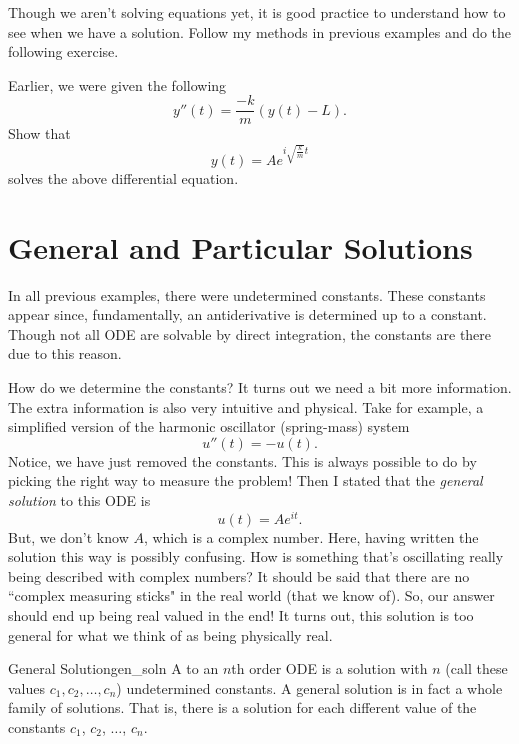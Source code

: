         
        \noindent Though we aren't solving equations yet, it is good practice to understand how to see when we have a solution.  Follow my methods in previous examples and do the following exercise.
        
        \begin{exercise} Earlier, we were given the following
        \[
        y''(t) = \frac{-k}{m} (y(t)-L).
        \]
        Show that
        \[
        y(t) = Ae^{i\sqrt{\frac{k}{m}}t}
        \]
        solves the above differential equation.
        \end{exercise}
        
        \section{General and Particular Solutions}
        In all previous examples, there were undetermined constants.  These constants appear since, fundamentally, an antiderivative is determined up to a constant.  Though not all ODE are solvable by direct integration, the constants are there due to this reason.
        
        How do we determine the constants?  It turns out we need a bit more information.  The extra information is also very intuitive and physical.  Take for example, a simplified version of the harmonic oscillator (spring-mass) system
        \[
        u''(t) = -u(t).
        \]
        Notice, we have just removed the constants.  This is always possible to do by picking the right way to measure the problem! Then I stated that the \emph{general solution}  to this ODE is
        \[
        u(t)=Ae^{it}.
        \]
        But, we don't know $A$, which is a complex number. Here, having written the solution this way is possibly confusing.  How is something that's oscillating really being described with complex numbers? It should be said that there are no ``complex measuring sticks" in the real world (that we know of).  So, our answer should end up being real valued in the end! It turns out, this solution is too general for what we think of as being physically real.
        
        \begin{df}{General Solution}{gen_soln}
            A  to an $n$th order ODE is a solution with $n$  (call these values $c_1,c_2,\dots,c_n$) undetermined constants. A general solution is in fact a whole family of solutions. That is, there is a solution for each different value of the constants $c_1$, $c_2$, $\dots$, $c_n$.
        \end{df}
        
